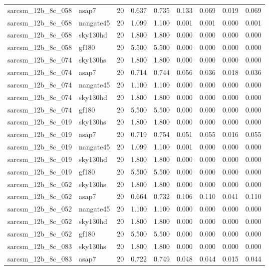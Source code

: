 \begin{tabular}{llrrrrrrr}
sarcsm\_12b\_8c\_058 & asap7 & 20 & 0.637 & 0.735 & 0.133 & 0.069 & 0.019 & 0.069 \\
sarcsm\_12b\_8c\_058 & nangate45 & 20 & 1.099 & 1.100 & 0.001 & 0.001 & 0.000 & 0.001 \\
sarcsm\_12b\_8c\_058 & sky130hd & 20 & 1.800 & 1.800 & 0.000 & 0.000 & 0.000 & 0.000 \\
sarcsm\_12b\_8c\_058 & gf180 & 20 & 5.500 & 5.500 & 0.000 & 0.000 & 0.000 & 0.000 \\
sarcsm\_12b\_8c\_074 & sky130hs & 20 & 1.800 & 1.800 & 0.000 & 0.000 & 0.000 & 0.000 \\
sarcsm\_12b\_8c\_074 & asap7 & 20 & 0.714 & 0.744 & 0.056 & 0.036 & 0.018 & 0.036 \\
sarcsm\_12b\_8c\_074 & nangate45 & 20 & 1.100 & 1.100 & 0.000 & 0.000 & 0.000 & 0.000 \\
sarcsm\_12b\_8c\_074 & sky130hd & 20 & 1.800 & 1.800 & 0.000 & 0.000 & 0.000 & 0.000 \\
sarcsm\_12b\_8c\_074 & gf180 & 20 & 5.500 & 5.500 & 0.000 & 0.000 & 0.000 & 0.000 \\
sarcsm\_12b\_8c\_019 & sky130hs & 20 & 1.800 & 1.800 & 0.000 & 0.000 & 0.000 & 0.000 \\
sarcsm\_12b\_8c\_019 & asap7 & 20 & 0.719 & 0.754 & 0.051 & 0.055 & 0.016 & 0.055 \\
sarcsm\_12b\_8c\_019 & nangate45 & 20 & 1.099 & 1.100 & 0.001 & 0.000 & 0.000 & 0.000 \\
sarcsm\_12b\_8c\_019 & sky130hd & 20 & 1.800 & 1.800 & 0.000 & 0.000 & 0.000 & 0.000 \\
sarcsm\_12b\_8c\_019 & gf180 & 20 & 5.500 & 5.500 & 0.000 & 0.000 & 0.000 & 0.000 \\
sarcsm\_12b\_8c\_052 & sky130hs & 20 & 1.800 & 1.800 & 0.000 & 0.000 & 0.000 & 0.000 \\
sarcsm\_12b\_8c\_052 & asap7 & 20 & 0.664 & 0.732 & 0.106 & 0.110 & 0.041 & 0.110 \\
sarcsm\_12b\_8c\_052 & nangate45 & 20 & 1.100 & 1.100 & 0.000 & 0.000 & 0.000 & 0.000 \\
sarcsm\_12b\_8c\_052 & sky130hd & 20 & 1.800 & 1.800 & 0.000 & 0.000 & 0.000 & 0.000 \\
sarcsm\_12b\_8c\_052 & gf180 & 20 & 5.500 & 5.500 & 0.000 & 0.000 & 0.000 & 0.000 \\
sarcsm\_12b\_8c\_083 & sky130hs & 20 & 1.800 & 1.800 & 0.000 & 0.000 & 0.000 & 0.000 \\
sarcsm\_12b\_8c\_083 & asap7 & 20 & 0.722 & 0.749 & 0.048 & 0.044 & 0.015 & 0.044 \\

\end{tabular}
